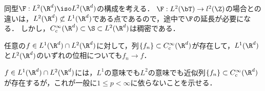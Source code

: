 \documentclass[uplatex,dvipdfmx]{jsreport}
\begin{document}
\begin{tcolorbox}[colframe=ForestGreen, colback=ForestGreen!10!white,breakable,colbacktitle=ForestGreen!40!white,coltitle=black,fonttitle=\bfseries\sffamily,
title=]
    同型$\F:L^2(\R^d)\iso L^2(\R^d)$の構成を考える．
    $\F:L^2(\bT)\to l^2(\Z)$の場合との違いは，$L^2(\R^d)\not\subset L^1(\R^d)$である点であるので，途中で$\F$の延長が必要になる．
    しかし，$C_c^\infty(\R^d)\subset\S\subset L^2(\R^d)$は稠密である．
\end{tcolorbox}

\begin{lemma}
    任意の$f\in L^1(\R^d)\cap L^2(\R^d)$に対して，列$\{f_n\}\subset C_c^\infty(\R^d)$が存在して，$L^1(\R^d)$と$L^2(\R^d)$のいずれの位相についても$f_n\to f$．
\end{lemma}
\begin{Proof}
    $f\in L^1(\R^d)\cap L^2(\R^d)$には，$L^1$の意味でも$L^2$の意味でも近似列$\{f_n\}\subset C_c^\infty(\R^d)$が存在するが，これが一般に$1\le p<\infty$に依らないことを示せる．
\end{Proof}
\end{document}
